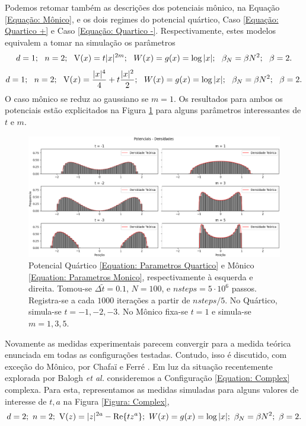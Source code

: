 Podemos retomar também as descrições dos potenciais mônico, na Equação \eqref{Equação: Mônico}, e os dois regimes do potencial quártico, Caso \eqref{Equação: Quartico +} e Caso \eqref{Equação: Quartico -}. Respectivamente, estes modelos equivalem a tomar na simulação os parâmetros
\begin{equation}
	d = 1; \ \  n = 2; \ \ \V(x)= t |x|^{2m}; \ \ W(x) = g(x) = \log{|x|}; \ \ \beta_N = \beta N^2; \ \ \beta = 2.
	\label{Equation: Parametros Monico}
\end{equation}
\begin{equation}
	d = 1; \ \  n = 2; \ \ \V(x)=\frac{|x|^4}{4} + t \frac{|x|^2}{2}; \ \ W(x) = g(x) = \log{|x|}; \ \ \beta_N = \beta N^2; \ \ \beta = 2.
	\label{Equation: Parametros Quartico}
\end{equation}
O caso mônico se reduz ao gaussiano se $m=1$. Os resultados para ambos os potenciais estão explicitados na Figura \ref{Figura: Quartic Monic} para alguns parâmetros interessantes de $t$ e $m$.
\begin{figure}[ht!]
	\centering
	\includegraphics[width=\textwidth]{Assets/validationQuarticMonic-alt.png}
	\caption{Potencial Quártico \eqref{Equation: Parametros Quartico} e Mônico \eqref{Equation: Parametros Monico}, respectivamente à esquerda e direita. Tomou-se $\Delta \tilde{t} = 0.1$, $N=100$, e $nsteps = 5\cdot10^6$ passos. Registra-se a cada $1000$ iterações a partir de $nsteps/5$. No Quártico, simula-se $t=-1,-2,-3$. No Mônico fixa-se $t=1$ e simula-se $m=1,3,5$.}
	\label{Figura: Quartic Monic}
\end{figure}

Novamente as medidas experimentais parecem convergir para a medida teórica enunciada em todas as configurações testadas. Contudo, isso é discutido, com exceção do Mônico, por Chafa\"{i} e Ferré \cite{Chafa2018}. Em luz da situação recentemente explorada por Balogh \textit{et al.} \cite{balogh2016orthogonal} consideremos a Configuração \eqref{Equation: Complex} complexa. Para esta, representamos as medidas simuladas para alguns valores de interesse de $t, a$ na Figura \ref{Figura: Complex},
\begin{equation}
	d = 2; \  n = 2; \  \operatorname{V}(z)=|z|^{2a} - \Re{t z^a};  \ W(x) = g(x) = \log{|x|};  \ \beta_N = \beta N^2;  \ \beta = 2.
	\label{Equation: Complex}
\end{equation}

